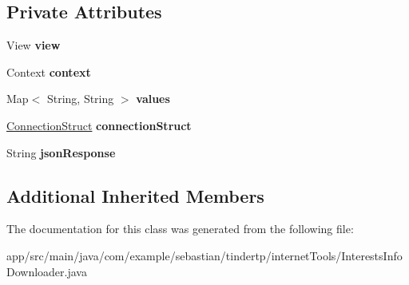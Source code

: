 \subsection*{Private Attributes}
\begin{DoxyCompactItemize}
\item 
View {\bfseries view}\hypertarget{classcom_1_1example_1_1sebastian_1_1tindertp_1_1internetTools_1_1InterestsInfoDownloader_a8825977e72b0da88f9779e0218bbf1c6}{}\label{classcom_1_1example_1_1sebastian_1_1tindertp_1_1internetTools_1_1InterestsInfoDownloader_a8825977e72b0da88f9779e0218bbf1c6}

\item 
Context {\bfseries context}\hypertarget{classcom_1_1example_1_1sebastian_1_1tindertp_1_1internetTools_1_1InterestsInfoDownloader_a72baf18900b89a3ffb5b07b6f808b755}{}\label{classcom_1_1example_1_1sebastian_1_1tindertp_1_1internetTools_1_1InterestsInfoDownloader_a72baf18900b89a3ffb5b07b6f808b755}

\item 
Map$<$ String, String $>$ {\bfseries values}\hypertarget{classcom_1_1example_1_1sebastian_1_1tindertp_1_1internetTools_1_1InterestsInfoDownloader_a7d594f63039c8fa0f8af3520853df110}{}\label{classcom_1_1example_1_1sebastian_1_1tindertp_1_1internetTools_1_1InterestsInfoDownloader_a7d594f63039c8fa0f8af3520853df110}

\item 
\hyperlink{classcom_1_1example_1_1sebastian_1_1tindertp_1_1commonTools_1_1ConnectionStruct}{Connection\+Struct} {\bfseries connection\+Struct}\hypertarget{classcom_1_1example_1_1sebastian_1_1tindertp_1_1internetTools_1_1InterestsInfoDownloader_a88edbd3b95e7efe7c94753145e5a550b}{}\label{classcom_1_1example_1_1sebastian_1_1tindertp_1_1internetTools_1_1InterestsInfoDownloader_a88edbd3b95e7efe7c94753145e5a550b}

\item 
String {\bfseries json\+Response}\hypertarget{classcom_1_1example_1_1sebastian_1_1tindertp_1_1internetTools_1_1InterestsInfoDownloader_a914428c2cf7f38b32bd22df599f94923}{}\label{classcom_1_1example_1_1sebastian_1_1tindertp_1_1internetTools_1_1InterestsInfoDownloader_a914428c2cf7f38b32bd22df599f94923}

\end{DoxyCompactItemize}
\subsection*{Additional Inherited Members}


The documentation for this class was generated from the following file\+:\begin{DoxyCompactItemize}
\item 
app/src/main/java/com/example/sebastian/tindertp/internet\+Tools/Interests\+Info\+Downloader.\+java\end{DoxyCompactItemize}
